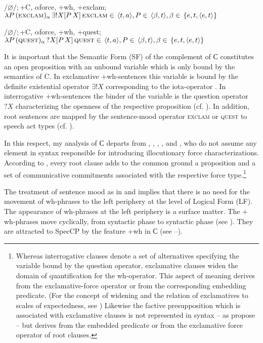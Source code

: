 \documentclass[output=paper,colorlinks,citecolor=brown]{langscibook}
\begin{document}
\ea \label{ex:zi08:25} $/\varnothing/$;\,$+$C, $\alpha$force, $+$wh, $+$exclam; $\lambda P\,(\textsc{exclam})_{\alpha}\, \exists ! X [P\, X]\,\textsc{exclam} \in\,\langle t,a \rangle , P \in\,\langle \beta,t \rangle , \beta \in\,\{e, t, \langle e,t \rangle \}$
\z

\ea \label{ex:zi08:26} $/\varnothing/$;\,+C, $\alpha$force, +wh, +quest; $\lambda P\,(\textsc{quest})_{\alpha}\, ? X [P\, X]\,\textsc{quest} \in\,\langle t,a \rangle , P \in\,\langle \beta,t \rangle , \beta \in\,\{e, t, \langle e,t \rangle \}$
\z

\noindent It is important that the Semantic Form (SF) of the complement of С constitutes an open proposition with an unbound variable which is only bound by the semantics of C. In exclamative $+$wh-sentences this variable is bound by the definite existential operator $\exists !X$ corresponding to the iota-operator \citep{zi08:Zybatow1990,Rosengren1992,Brandt-Reis-etal1992}. In interrogative $+$wh-sentences the binder of the variable is the question operator $?X$ characterizing the openness of the respective proposition (cf. \citealt{Brandt-Reis-etal1992}). In addition, root sentences are mapped by the sentence-mood operator \textsc{exclam} or \textsc{quest} to speech act types (cf. \citealt{zi08:Krifka2001}).

In this respect, my analysis of С departs from \citet{Brandt-Reis-etal1992}, \citet{zi08:Reis1999}, \citet{dAvis2002}, \citet{Zanuttini-Portner2003}, and \citet{Abels2007}, who do not assume any element in syntax responsible for introducing illocutionary force characterizations. According to \citet{Zimmermann2009}, every root clause adds to the common ground a proposition and a set of communicative commitments associated with the respective force type.\footnote{\label{fn:zi08:5}Whereas interrogative clauses denote a set of alternatives specifying the variable bound by the question operator, exclamative clauses widen the domain of quantification for the wh-operator. This aspect of meaning derives from the exclamative-force operator or from the corresponding embedding predicate. (For the concept of widening and the relation of exclamatives to scales of expectedness, see \citealt[49ff.]{Zanuttini-Portner2003}) Likewise the factive presupposition which is associated with exclamative clauses is not represented in syntax -- as \citet{Zanuttini-Portner2003} propose -- but derives from the embedded predicate or from the exclamative force operator of root clauses.}

The treatment of sentence mood as in  and  implies that there is no need for the movement of wh-phrases to the left periphery at the level of Logical Form (LF). The appearance of wh-phrases at the left periphery is a surface matter. The $+$wh-phrases move cyclically, from syntactic phase to syntactic phase (see \citealt{zi08:Chomsky1995,Chomsky2004}). They are attracted to SpecCP by the feature $+$wh in С (see --).
\end{document}
